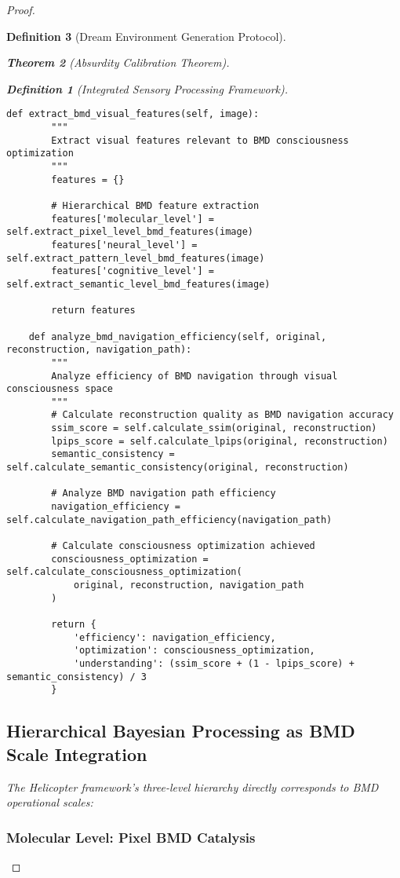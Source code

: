 \documentclass[12pt,a4paper]{article}
\newtheorem{theorem}{Theorem}[section]
\newtheorem{definition}[theorem]{Definition}
\begin{document}
\begin{proof}
\begin{definition}[Dream Environment Generation Protocol]
\begin{theorem}[Absurdity Calibration Theorem]
\begin{observation}
\begin{definition}[Integrated Sensory Processing Framework]
\begin{lstlisting}[style=pythonstyle, caption=BMD Navigation Validation Through Visual Reconstruction]
    def extract_bmd_visual_features(self, image):
        """
        Extract visual features relevant to BMD consciousness optimization
        """
        features = {}
        
        # Hierarchical BMD feature extraction
        features['molecular_level'] = self.extract_pixel_level_bmd_features(image)
        features['neural_level'] = self.extract_pattern_level_bmd_features(image)
        features['cognitive_level'] = self.extract_semantic_level_bmd_features(image)
        
        return features
    
    def analyze_bmd_navigation_efficiency(self, original, reconstruction, navigation_path):
        """
        Analyze efficiency of BMD navigation through visual consciousness space
        """
        # Calculate reconstruction quality as BMD navigation accuracy
        ssim_score = self.calculate_ssim(original, reconstruction)
        lpips_score = self.calculate_lpips(original, reconstruction)
        semantic_consistency = self.calculate_semantic_consistency(original, reconstruction)
        
        # Analyze BMD navigation path efficiency
        navigation_efficiency = self.calculate_navigation_path_efficiency(navigation_path)
        
        # Calculate consciousness optimization achieved
        consciousness_optimization = self.calculate_consciousness_optimization(
            original, reconstruction, navigation_path
        )
        
        return {
            'efficiency': navigation_efficiency,
            'optimization': consciousness_optimization,
            'understanding': (ssim_score + (1 - lpips_score) + semantic_consistency) / 3
        }
\end{lstlisting}

\subsection{Hierarchical Bayesian Processing as BMD Scale Integration}

The Helicopter framework's three-level hierarchy directly corresponds to BMD operational scales:

\subsubsection{Molecular Level: Pixel BMD Catalysis}


\end{definition}
\end{observation}
\end{theorem}
\end{definition}
\end{proof}
\end{document}
